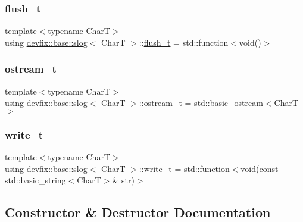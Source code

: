 \subsubsection{\texorpdfstring{flush\+\_\+t}{flush\_t}}
{\footnotesize\ttfamily template$<$typename CharT$>$ \\
using \hyperlink{structdevfix_1_1base_1_1slog}{devfix\+::base\+::slog}$<$ CharT $>$\+::\hyperlink{structdevfix_1_1base_1_1slog_a5c957ca5d7392786ede9f813ec40fb40}{flush\+\_\+t} =  std\+::function$<$void()$>$}

\mbox{\label{structdevfix_1_1base_1_1slog_a3602226e6adc9ea19626e25a0df085a6}} 
\subsubsection{\texorpdfstring{ostream\+\_\+t}{ostream\_t}}
{\footnotesize\ttfamily template$<$typename CharT$>$ \\
using \hyperlink{structdevfix_1_1base_1_1slog}{devfix\+::base\+::slog}$<$ CharT $>$\+::\hyperlink{structdevfix_1_1base_1_1slog_a3602226e6adc9ea19626e25a0df085a6}{ostream\+\_\+t} =  std\+::basic\+\_\+ostream$<$CharT$>$}

\mbox{\label{structdevfix_1_1base_1_1slog_a5897ebe6b65ffd7a1845a6bca989f288}} 
\subsubsection{\texorpdfstring{write\+\_\+t}{write\_t}}
{\footnotesize\ttfamily template$<$typename CharT$>$ \\
using \hyperlink{structdevfix_1_1base_1_1slog}{devfix\+::base\+::slog}$<$ CharT $>$\+::\hyperlink{structdevfix_1_1base_1_1slog_a5897ebe6b65ffd7a1845a6bca989f288}{write\+\_\+t} =  std\+::function$<$void(const std\+::basic\+\_\+string$<$CharT$>$\& str)$>$}



\subsection{Constructor \& Destructor Documentation}
\mbox{\label{structdevfix_1_1base_1_1slog_aa27391ee2412df5d659cf98121a8e198}} 
